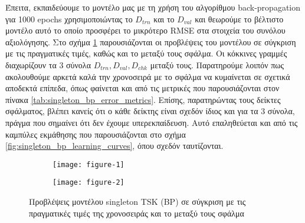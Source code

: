 \documentclass[11pt,a4paper,titlepage, oneside]{article}
\newlength\figureheight
\newlength\figurewidth
\begin{document}
			 Έπειτα, εκπαιδεύουμε το μοντέλο μας με τη χρήση του αλγορίθμου back-propagation για 1000 epochs χρησιμοποιώντας το $D_{trn}$ και το $D_{val}$ και θεωρούμε το βέλτιστο μοντέλο αυτό το οποίο προσφέρει το μικρότερο RMSE στα στοιχεία του συνόλου αξιολόγησης. Στο σχήμα \ref{fig:singleton_bp_predictions} παρουσιάζονται οι προβλέψεις του μοντέλου σε σύγκριση με τις πραγματικές τιμές, καθώς και το μεταξύ τους σφάλμα. Οι κόκκινες γραμμές διαχωρίζουν τα 3 σύνολα $D_{trn}, D_{val}, D_{chk}$ μεταξύ τους. Παρατηρούμε λοιπόν πως ακολουθούμε αρκετά καλά την χρονοσειρά με το σφάλμα να κυμαίνεται σε σχετικά αποδεκτά επίπεδα, όπως φαίνεται και από τις μετρικές που παρουσιάζονται στον πίνακα \ref{tab:singleton_bp_error_metrics}. Επίσης, παρατηρώντας τους δείκτες σφάλματος, βλέπει κανείς ότι ο κάθε δείκτης είναι σχεδόν ίδιος και για τα 3 σύνολα, πράγμα που σημαίνει ότι δεν έχουμε υπερεκπαίδευση. Αυτό επαληθεύεται και από τις καμπύλες εκμάθησης που παρουσιάζονται στο σχήμα \ref{fig:singleton_bp_learning_curves}, όπου σχεδόν ταυτίζονται.\\
						
			\begin{figure}[h]
			 	\setlength{}
				\setlength{}	
				\centering
				\begin{subfigure}[b]{0.49\textwidth}
					\texttt{[image: figure-1]}
				\end{subfigure}
				\begin{subfigure}[b]{0.49\textwidth}
					\texttt{[image: figure-2]}
				\end{subfigure}
				\caption{Προβλέψεις μοντέλου singleton TSK (BP) σε σύγκριση με τις πραγματικές τιμές της χρονοσειράς και το μεταξύ τους σφάλμα}
				\label{fig:singleton_bp_predictions}
			\end{figure}
			
\end{document}
